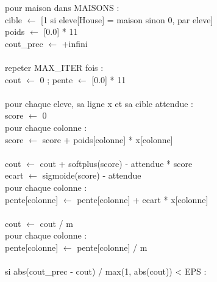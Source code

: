 \begin{pseudo}
pour maison dans MAISONS :\\
\hspace*{2em}cible $\leftarrow$ [1 si eleve[House] = maison sinon 0, par eleve]\\
\hspace*{2em}poids $\leftarrow$ [0.0] * 11\\
\hspace*{2em}cout\_prec $\leftarrow$ +infini\\
\\
\hspace*{2em}repeter MAX\_ITER fois :\\
\hspace*{4em}cout $\leftarrow$ 0 ; pente $\leftarrow$ [0.0] * 11\\
\\
\hspace*{4em}pour chaque eleve, sa ligne x et sa cible attendue :\\
\hspace*{6em}score $\leftarrow$ 0\\
\hspace*{6em}pour chaque colonne :\\
\hspace*{8em}score $\leftarrow$ score + poids[colonne] * x[colonne]\\
\\
\hspace*{6em}cout $\leftarrow$ cout + softplus(score) - attendue * score\\
\hspace*{6em}ecart $\leftarrow$ sigmoide(score) - attendue\\
\hspace*{6em}pour chaque colonne :\\
\hspace*{8em}pente[colonne] $\leftarrow$ pente[colonne] + ecart * x[colonne]\\
\\
\hspace*{4em}cout $\leftarrow$ cout / m\\
\hspace*{4em}pour chaque colonne :\\
\hspace*{6em}pente[colonne] $\leftarrow$ pente[colonne] / m\\
\\
\hspace*{4em}si abs(cout\_prec - cout) / max(1, abs(cout)) < EPS :\\

\end{pseudo}
